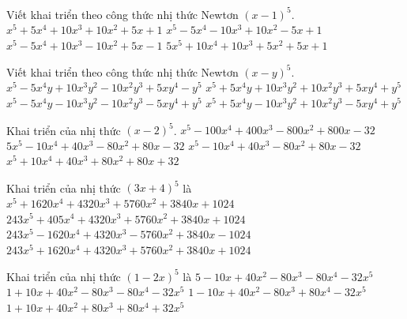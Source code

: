 \begin{ex}%
	Viết khai triển theo công thức nhị thức Newtơn $(x-1)^5$.
	\choice
	{$x^5+5x^4+10x^3+10x^2+5x+1$}
	{$x^5-5x^4-10x^3+10x^2-5x+1$}
	{\True $x^5-5x^4+10x^3-10x^2+5x-1$}
	{$5x^5+10x^4+10x^3+5x^2+5x+1$}
\end{ex}
\begin{ex}%
	Viết khai triển theo công thức nhị thức Newtơn $(x-y)^5$.
	\choice
	{\True $x^5-5x^4y+10x^3y^2-10x^2y^3+5xy^4-y^5$}
	{$x^5+5x^4y+10x^3y^2+10x^2y^3+5xy^4+y^5$}
	{$x^5-5x^4y-10x^3y^2-10x^2y^3-5xy^4+y^5$}
	{$x^5+5x^4y-10x^3y^2+10x^2y^3-5xy^4+y^5$}
\end{ex}
\begin{ex}%
	Khai triển của nhị thức $(x-2)^5$.
	\choice
	{$x^5-100x^4+400x^3-800x^2+800x-32$}
	{$5x^5-10x^4+40x^3-80x^2+80x-32$}
	{\True $x^5-10x^4+40x^3-80x^2+80x-32$}
	{$x^5+10x^4+40x^3+80x^2+80x+32$}
\end{ex}
\begin{ex}%
	Khai triển của nhị thức $(3x+4)^5$ là
	\choice
	{$x^5+1620x^4+4320x^3+5760x^2+3840x+1024$}
	{$243x^5+405x^4+4320x^3+5760x^2+3840x+1024$}
	{$243x^5-1620x^4+4320x^3-5760x^2+3840x-1024$}
	{\True $243x^5+1620x^4+4320x^3+5760x^2+3840x+1024$}
\end{ex}
\begin{ex}%
	Khai triển của nhị thức $(1-2x)^5$ là
	\choice
	{$5-10x+40x^2-80x^3-80x^4-32x^5$}
	{$1+10x+40x^2-80x^3-80x^4-32x^5$}
	{\True $1-10x+40x^2-80x^3+80x^4-32x^5$}
	{$1+10x+40x^2+80x^3+80x^4+32x^5$}
\end{ex}

